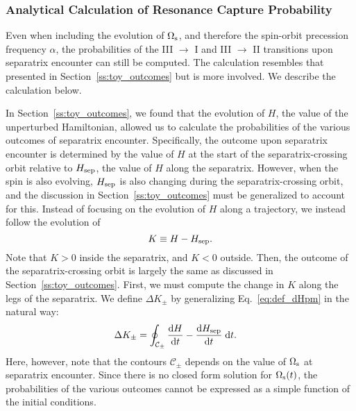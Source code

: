 \documentclass[
        fleqn,
        usenatbib,
    ]{mnras}
\newcommand*{\rd}[2]{\frac{\mathrm{d}#1}{\mathrm{d}#2}}
\begin{document}
\subsubsection{Analytical Calculation of Resonance Capture Probability
}\label{ss:phop_weaktide}

Even when including the evolution of $\Omega_{\rm s}$, and therefore the
spin-orbit precession frequency $\alpha$, the probabilities of the III $\to$ I
and III $\to$ II transitions upon separatrix encounter can still be computed.
The calculation resembles that presented in Section~\ref{ss:toy_outcomes} but is
more involved. We describe the calculation below.

In Section~\ref{ss:toy_outcomes}, we found that the evolution of $H$, the value
of the unperturbed Hamiltonian, allowed us to calculate the probabilities of the
various outcomes of separatrix encounter. Specifically, the outcome upon
separatrix encounter is determined by the value of $H$ at the start of the
separatrix-crossing orbit relative to $H_{\rm sep}$, the value of $H$ along the
separatrix. However, when the spin is also evolving, $H_{\rm sep}$ is also
changing during the separatrix-crossing orbit, and the discussion in
Section~\ref{ss:toy_outcomes} must be generalized to account for this. Instead
of focusing on the evolution of $H$ along a trajectory, we instead follow the
evolution of
\begin{equation}
    K \equiv H - H_{\rm sep}.
\end{equation}
Note that $K > 0$ inside the separatrix, and $K < 0$ outside. Then, the outcome
of the separatrix-crossing orbit is largely the same as discussed in
Section~\ref{ss:toy_outcomes}. First, we must compute the change in $K$ along
the legs of the separatrix. We define $\Delta K_{\pm}$ by generalizing
Eq.~\eqref{eq:def_dHpm} in the natural way:
\begin{align}
    \Delta K_{\pm} &= \oint_{\mathcal{C}_{\pm}} \rd{H}{t}
        - \rd{H_{\rm sep}}{t}\;\mathrm{d}t.\label{eq:def_dK_weaktide}
\end{align}
Here, however, note that the contours $\mathcal{C}_{\pm}$ depends on the value
of $\Omega_{\rm s}$ at separatrix encounter. Since there is no closed form
solution for $\Omega_{\rm s}(t)$, the probabilities of the various outcomes
cannot be expressed as a simple function of the initial conditions.
\end{document}
